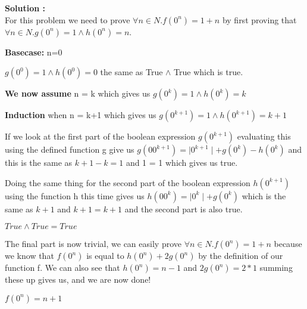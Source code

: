 \documentclass{article}
\newcounter{problem}
\newcounter{solution}
\newcommand\ASolution{%
  \stepcounter{solution}%
  \textbf{Solution \thesolution:}\\%
}
\begin{document}
\ASolution
For this problem we need to prove $\forall n \in N. f(0^n) = 1+n$ by first proving that $\forall n \in N. g(0^n) = 1 \wedge h(0^n) = n$.

\textbf{Basecase:} n=0

$g(0^0) = 1 \wedge h(0^0) = 0$ the same as True $\wedge$ True which is true.

\textbf{We now assume} n = k which gives us $g(0^k) = 1 \wedge h(0^k) = k$

\textbf{Induction} when n = k+1 which gives us $g(0^{k+1}) = 1 \wedge h(0^{k+1}) = k+1$

If we look at the first part of the boolean expression $g(0^{k+1})$ evaluating this using the defined function g give us $g(00^{k+1}) = \mid 0^{k+1} \mid + g(0^k) - h(0^k)$ and this is the same as $k + 1 - k = 1$ and 1 = 1 which gives us true.

Doing the same thing for the second part of the boolean expression $h(0^{k+1})$ using the function h this time gives us $h(00^k) = \mid 0^k \mid + g(0^k)$ which is the same as $k + 1$ and $k+1 = k+1$ and the second part is also true.

$True \wedge True = True$ 

 \hfill 
 \square
 \newpage
 
 The final part is now trivial, we can easily prove $\forall n \in N. f(0^n) = 1+n$ because we know that $f(0^n)$ is equal to $h(0^n) + 2g(0^n)$ by the definition of our function f. We can also see that $h(0^n) = n-1$ and $2g(0^n) = 2*1$ summing these up gives us, and we are now done!
 \begin{center}
     $f(0^n) = n+1$
 \end{center}
\hfill
\square
\end{document}
